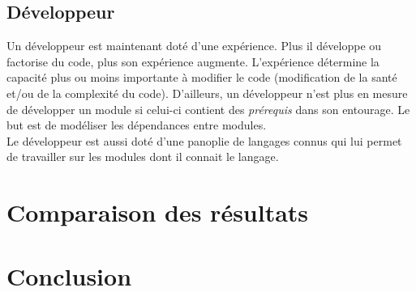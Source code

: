 \documentclass{article}
\begin{document}
\newpage
\subsection{Développeur}
Un développeur est maintenant doté d'une expérience. Plus il développe ou factorise du code, plus son expérience augmente. L'expérience détermine la capacité plus ou moins importante à modifier le code (modification de la santé et/ou de la complexité du code). 
D'ailleurs, un développeur n'est plus en mesure de développer un module si celui-ci contient des \textit{prérequis} dans son entourage. Le but est de modéliser les dépendances entre modules.
\\

Le développeur est aussi doté d'une panoplie de langages connus qui lui permet de travailler sur les modules dont il connait le langage.

\section{Comparaison des résultats}


\section{Conclusion}
\end{document}

